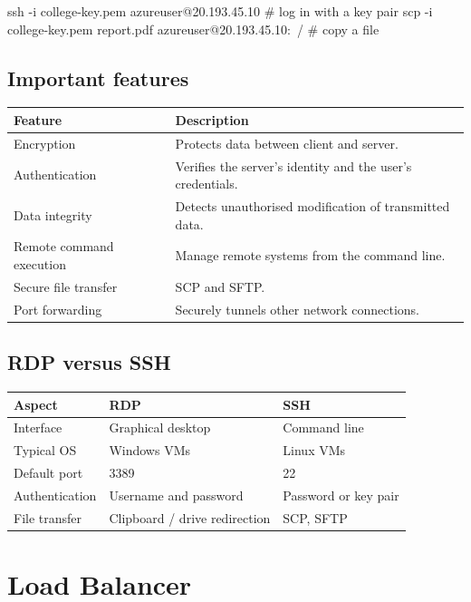 \documentclass[11pt,a4paper]{article}
\begin{document}
\begin{sh}
ssh -i college-key.pem azureuser@20.193.45.10    # log in with a key pair
scp -i college-key.pem report.pdf azureuser@20.193.45.10:~/   # copy a file
\end{sh}

\subsection{Important features}

\begin{tabularx}{\textwidth}{@{}lX@{}}
\toprule
\rowcolor{tablehead}\textbf{Feature} & \textbf{Description} \\
\midrule
Encryption & Protects data between client and server. \\
Authentication & Verifies the server's identity and the user's credentials. \\
Data integrity & Detects unauthorised modification of transmitted data. \\
Remote command execution & Manage remote systems from the command line. \\
Secure file transfer & SCP and SFTP. \\
Port forwarding & Securely tunnels other network connections. \\
\bottomrule
\end{tabularx}

\subsection{RDP versus SSH}

\begin{tabularx}{\textwidth}{@{}lXX@{}}
\toprule
\rowcolor{tablehead}\textbf{Aspect} & \textbf{RDP} & \textbf{SSH} \\
\midrule
Interface & Graphical desktop & Command line \\
Typical OS & Windows VMs & Linux VMs \\
Default port & 3389 & 22 \\
Authentication & Username and password & Password or key pair \\
File transfer & Clipboard / drive redirection & SCP, SFTP \\
\bottomrule
\end{tabularx}

\section{Load Balancer}
\end{document}
